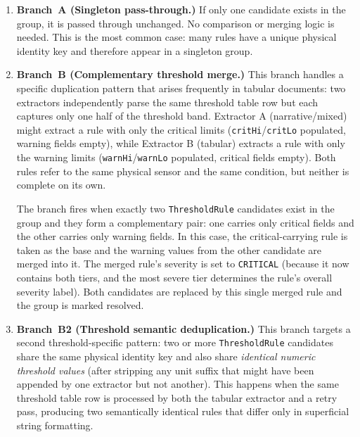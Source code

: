 ﻿\documentclass[11pt]{article}
\begin{document}
\begin{enumerate}
    \item \textbf{Branch~A (Singleton pass-through.)}
          If only one candidate exists in the group, it is passed through
          unchanged.  No comparison or merging logic is needed.  This is the most
          common case: many rules have a unique physical identity key and therefore
          appear in a singleton group.

    \item \textbf{Branch~B (Complementary threshold merge.)}
          This branch handles a specific duplication pattern that arises frequently
          in tabular documents: two extractors independently parse the same threshold
          table row but each captures only one half of the threshold band.  Extractor A
          (narrative/mixed) might extract a rule with only the critical limits
          (\texttt{critHi}/\texttt{critLo} populated, warning fields empty), while
          Extractor B (tabular) extracts a rule with only the warning limits
          (\texttt{warnHi}/\texttt{warnLo} populated, critical fields empty).
          Both rules refer to the same physical sensor and the same condition, but
          neither is complete on its own.

          The branch fires when exactly two \texttt{ThresholdRule} candidates exist
          in the group and they form a complementary pair: one carries only critical
          fields and the other carries only warning fields.  In this case, the
          critical-carrying rule is taken as the base and the warning values from
          the other candidate are merged into it.  The merged rule's severity is set
          to \texttt{CRITICAL} (because it now contains both tiers, and the most
          severe tier determines the rule's overall severity label).  Both candidates
          are replaced by this single merged rule and the group is marked resolved.

    \item \textbf{Branch~B2 (Threshold semantic deduplication.)}
          This branch targets a second threshold-specific pattern: two or more
          \texttt{ThresholdRule} candidates share the same physical identity key and
          also share \emph{identical numeric threshold values} (after stripping any
          unit suffix that might have been appended by one extractor but not another).
          This happens when the same threshold table row is processed by both the
          tabular extractor and a retry pass, producing two semantically identical
          rules that differ only in superficial string formatting.


\end{enumerate}
\end{document}
